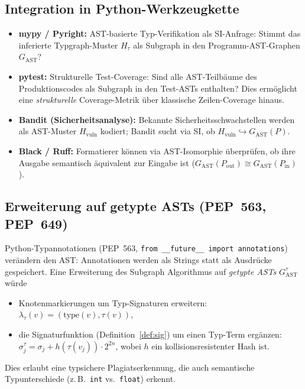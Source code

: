 ﻿\documentclass[a4paper,12pt]{article}
\theoremstyle{definition}
\begin{document}
\subsection{Integration in Python-Werkzeugkette}

\begin{itemize}
    \item \textbf{mypy / Pyright:} AST-basierte Typ-Verifikation
          als SI-Anfrage: Stimmt das inferierte Typgraph-Muster
          $H_{\tau}$ als Subgraph in den Programm-AST-Graphen
          $G_{\mathrm{AST}}$?
    \item \textbf{pytest:} Strukturelle Test-Coverage: Sind alle
          AST-Teilb\"aume des Produktionscodes als Subgraph in
          den Test-ASTs enthalten?  Dies erm\"oglicht eine
          \emph{strukturelle} Coverage-Metrik \"uber klassische
          Zeilen-Coverage hinaus.
    \item \textbf{Bandit (Sicherheitsanalyse):} Bekannte
          Sicherheitsschwachstellen werden als AST-Muster
          $H_{\text{vuln}}$ kodiert; Bandit sucht via SI,
          ob $H_{\text{vuln}} \hookrightarrow G_{\mathrm{AST}}(P)$.
    \item \textbf{Black / Ruff:} Formatierer k\"onnen
          via AST-Isomorphie \"uberpr\"ufen, ob ihre Ausgabe
          semantisch \"aquivalent zur Eingabe ist
          ($G_{\mathrm{AST}}(P_{\mathrm{out}}) \cong
          G_{\mathrm{AST}}(P_{\mathrm{in}})$).
\end{itemize}

\subsection{Erweiterung auf getypte ASTs (PEP~563, PEP~649)}

Python-Typannotationen (PEP~563, \texttt{from \_\_future\_\_ import
annotations}) ver\"andern den AST: Annotationen werden als
Strings statt als Ausdr\"ucke gespeichert.  Eine Erweiterung
des Subgraph Algorithmus auf \emph{getypte ASTs}
$G_{\mathrm{AST}}^{\tau}$ w\"urde
\begin{itemize}
    \item Knotenmarkierungen um Typ-Signaturen erweitern:
          $\lambda_\tau(v) = (\mathrm{type}(v), \tau(v))$,
    \item die Signaturfunktion (Definition~\ref{def:sig}) um
          einen Typ-Term erg\"anzen:
          $\sigma_j^\tau = \sigma_j + h(\tau(v_j)) \cdot 2^{2n}$,
          wobei $h$ ein kollisionsresistenter Hash ist.
\end{itemize}
Dies erlaubt eine typsichere Plagiatserkennung, die auch
semantische Typunterschiede (z.\,B.\ \texttt{int} vs.\
\texttt{float}) erkennt.
\end{document}
